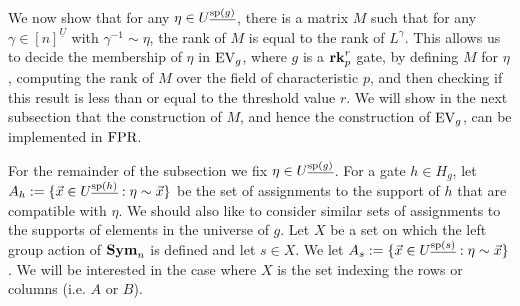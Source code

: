 \documentclass[../paper.tex]{subfiles}
\begin{document}


We now show that for any $\eta \in U^{\underline{\text{sp}(g)}}$, there is a matrix
$M$ such that for any $\gamma \in [n]^{\underline{U}}$ with $\gamma^{-1} \sim
\eta$, the rank of $M$ is equal to the rank of $L^{\gamma}$. This allows us to
decide the membership of $\eta$ in $\text{EV}_g$, where $g$ is a $\text{\textbf{rk}}^r_p$ gate, by
defining $M$ for $\eta$, computing the rank of $M$ over the field of
characteristic $p$, and then checking if this result is less than or equal to
the threshold value $r$. We will show in the next subsection that the
construction of $M$, and hence the construction of $\text{EV}_g$, can be implemented
in $\text{\upshape FPR}$.

For the remainder of the subsection we fix $\eta \in U^{\underline{\text{sp}(g)}}$.
For a gate $h \in H_g$, let $A_h := \{\vec{x} \in U^{\underline{\text{sp}(h)}} :
\eta \sim \vec{x}\}$ be the set of assignments to the support of $h$ that are
compatible with $\eta$. We should also like to consider similar sets of
assignments to the supports of elements in the universe of $g$. Let $X$ be a set
on which the left group action of $\text{\textbf{Sym}}_n$ is defined and let $s \in X$. We let
$A_s := \{\vec{x} \in U^{\underline{\text{sp}(s)}} : \eta \sim \vec{x}\}$. We will
be interested in the case where $X$ is the set indexing the rows or columns
(i.e. $A$ or $B$).
\end{document}
